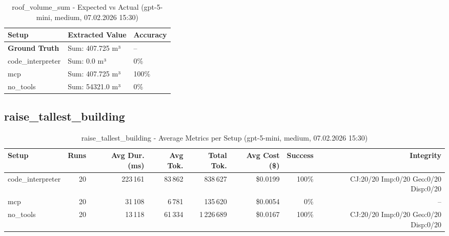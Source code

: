 \documentclass[a4paper,11pt]{article}
\begin{document}
\begin{table}[H]
\centering
\scriptsize
\caption{roof\_volume\_sum - Expected vs Actual (gpt-5-mini, medium, 07.02.2026 15:30)}
\begin{tabular}{l l l}
\toprule
Setup & Extracted Value & Accuracy \\
\midrule
\textbf{Ground Truth} & Sum: 407.725 m³ & -- \\
\midrule
code\_interpreter & Sum: 0.0 m³ & 0\% \\
mcp & Sum: 407.725 m³ & 100\% \\
no\_tools & Sum: 54321.0 m³ & 0\% \\
\bottomrule
\end{tabular}
\end{table}

\clearpage

\subsection{raise\_tallest\_building}

\begin{table}[H]
\centering
\scriptsize
\caption{raise\_tallest\_building - Average Metrics per Setup (gpt-5-mini, medium, 07.02.2026 15:30)}
\label{tab:combined\_raise\_tallest\_building\_metrics\_20260207}
\begin{tabular}{l r r r r r r r}
\toprule
Setup & Runs & Avg Dur. (ms) & Avg Tok. & Total Tok. & Avg Cost (\$) & Success & Integrity \\
\midrule
code\_interpreter & 20 & 223\,161 & 83\,862 & 838\,627 & \$0.0199 & 100\% & CJ:20/20 Imp:0/20 Geo:0/20 Disp:0/20 \\
mcp & 20 & 31\,108 & 6\,781 & 135\,620 & \$0.0054 & 0\% & -- \\
no\_tools & 20 & 13\,118 & 61\,334 & 1\,226\,689 & \$0.0167 & 100\% & CJ:20/20 Imp:0/20 Geo:0/20 Disp:0/20 \\
\bottomrule
\end{tabular}
\end{table}
\end{document}
